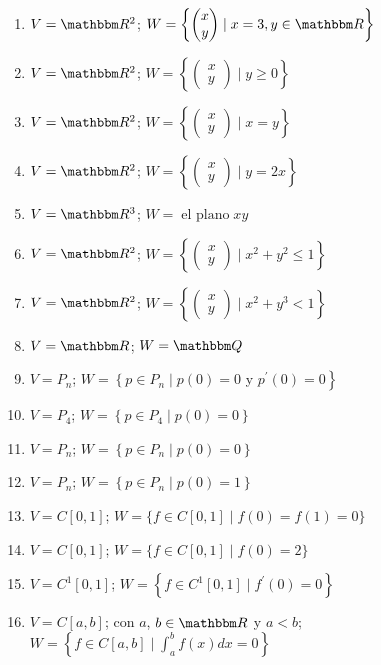 \begin{enumerate}[resume]
    \item $V=\RR[2]$; $W=\left\{ \begin{pmatrix} x \\ y \end{pmatrix} \mid x=3, y \in \RR \right\}$
    \item $V=\RR[2]$; $W=\left\{ \begin{pmatrix} x \\ y \end{pmatrix} \mid y \geq 0 \right\}$\newpage
    \item $V=\RR[2]$; $W=\left\{ \begin{pmatrix} x \\ y \end{pmatrix} \mid x=y \right\}$
    \item $V=\RR[2]$; $W=\left\{ \begin{pmatrix} x \\ y \end{pmatrix} \mid y=2 x \right\}$
    \item $V=\RR[3]$; $W = \operatorname{el~plano} x y$
    \item $V=\RR[2]$; $W=\left\{ \begin{pmatrix} x \\ y \end{pmatrix} \mid x^{2}+y^{2} \leq 1\right\}$
    \item $V=\RR[2]$; $W=\left\{ \begin{pmatrix} x \\ y \end{pmatrix} \mid x^{2}+y^{3}<1\right\}$
    \item $V=\RR$; $W=\QQ$
    \item $V=P_{n}$; $W=\left\{p \in P_{n}\mid p(0)=0\right.$ y $\left.p^{\prime}(0)=0\right\}$
    \item $V=P_{4}$; $W=\left\{p \in P_{4}\mid p(0)=0\right\}$
    \item $V=P_{n}$; $W=\left\{p \in P_{n}\mid p(0)=0\right\}$
    \item $V=P_{n}$; $W=\left\{p \in P_{n}\mid p(0)=1\right\}$
    \item $V=C[0,1]$; $W=\{f \in C[0,1]\mid f(0)=f(1)=0\}$
    \item $V=C[0,1]$; $W=\{f \in C[0,1]\mid f(0)=2\}$
    \item $V=C^{1}[0,1]$; $W=\left\{f \in C^{1}[0,1]\mid f^{\prime}(0)=0\right\}$
    \item $V=C[a, b]$; con $a$, $b \in \RR$ y $a<b$; $\displaystyle W=\left\{f \in C[a, b]\mid \int_{a}^{b} f(x) d x=0\right\}$

\end{enumerate}
